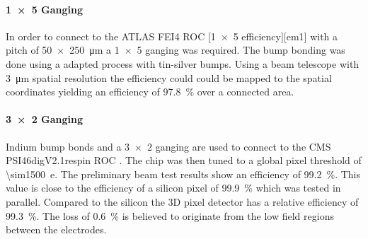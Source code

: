 \paragraph{\SI{1x5}{} Ganging}
In order to connect to the ATLAS FEI4 \ac{ROC} 
[\SI{1x5}{} efficiency][em1]
with a pitch of \SI{50x250}{\micro\meter} a \SI{1x5}{} ganging was required. The bump bonding was done using a adapted process with tin-silver bumps. Using a beam telescope with \SI{3}{\micro\meter} spatial resolution the efficiency could could be mapped to the spatial coordinates yielding an efficiency of \SI{97.8}{\%} over a connected area.
\paragraph{\SI{3x2}{} Ganging}
Indium bump bonds and a \SI{3x2}{} ganging are used to connect 
to the CMS PSI46digV2.1respin \ac{ROC} \cite{kornmayer}. The chip was then tuned to a global pixel threshold of \SI{\sim1500}{e}. The preliminary beam test results show an efficiency of \SI{99.2}{\%}. This value is close to the efficiency of a silicon pixel of \SI{99.9}{\%} which was tested in parallel. Compared to the silicon the 3D pixel detector has a relative efficiency of \SI{99.3}{\%}. The loss of \SI{0.6}{\%} is believed to originate from the low field regions between the electrodes.

